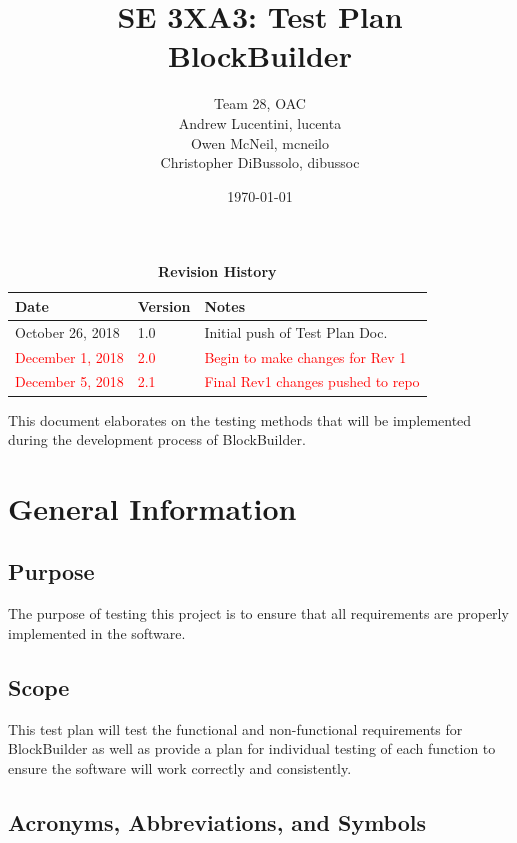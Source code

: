 \documentclass[12pt, titlepage]{article}
\title{SE 3XA3: Test Plan\\BlockBuilder}
\author{Team 28, OAC
		\\ Andrew Lucentini, lucenta
		\\ Owen McNeil, mcneilo
		\\ Christopher DiBussolo, dibussoc
}
\date{\today}
\begin{document}
\maketitle

\tableofcontents
\listoftables
\listoffigures

\begin{table}[bp]
\caption{\bf Revision History}
\begin{tabularx}{\textwidth}{p{3cm}p{2cm}X}
\toprule {\bf Date} & {\bf Version} & {\bf Notes}\\
\midrule
October 26, 2018 & 1.0 & Initial push of Test Plan Doc.\\
\midrule
\textcolor{red}{December 1, 2018} & \textcolor{red}{2.0} & \textcolor{red}{Begin to make changes for Rev 1}\\
\midrule
\textcolor{red}{December 5, 2018} & \textcolor{red}{2.1} & \textcolor{red}{Final Rev1 changes pushed to repo}\\
\bottomrule
\end{tabularx}
\end{table}

\newpage


This document elaborates on the testing methods that will be implemented during the development process of BlockBuilder.

\section{General Information}

\subsection{Purpose}

The purpose of testing this project is to ensure that all requirements are properly implemented in the software.      

\subsection{Scope}
This test plan will test the functional and non-functional requirements for BlockBuilder as well as provide a plan for individual testing of each function to ensure the software will work correctly and consistently.

\subsection{Acronyms, Abbreviations, and Symbols}
	
\end{document}
